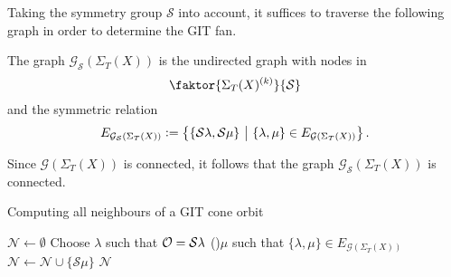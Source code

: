 Taking the symmetry group $\mathcal{S}$ into account, it suffices to traverse the following graph in order to determine the GIT fan.

\begin{defi}
	The graph $\mathcal{G}_\mathcal{S}(\Sigma_T(X))$ is the undirected graph with nodes in
	$$\faktor{\Sigma_T(X)^{(k)}}{\mathcal{S}}$$ 
	and the symmetric relation
	$$E_{\mathcal{G}_\mathcal{S}(\Sigma_T(X))} \mathrel{\mathop:}= \left\{\{\mathcal{S}\lambda, \mathcal{S}\mu\}\ \middle|\ \{\lambda, \mu\} \in  E_{\mathcal{G}(\Sigma_T(X))}\right\}.$$
\end{defi}

\begin{remark}
	Since $\mathcal{G}(\Sigma_T(X))$ is connected, it follows that the graph $\mathcal{G}_\mathcal{S}(\Sigma_T(X))$ is connected.
\end{remark}

\begin{algorithm}
	\caption{Computing all neighbours of a GIT cone orbit}
	\label{algo:git_cone_orbit_neighbours}
	
	\BlankLine
	$\mathcal{N} \leftarrow \emptyset$\;
	Choose $\lambda$ such that $\mathcal{O} = \mathcal{S}\lambda$\;
	\For(){$\mu$ such that $\{\lambda,\mu\}\in E_{\mathcal{G}(\Sigma_T(X))}$\label{algo_line:git_cone_orbit_neighbours_loop}}{
		$\mathcal{N}\leftarrow \mathcal{N} \cup \{\mathcal{S}\mu\}$\;
	}
	\Return $\mathcal{N}$\;
\end{algorithm}

